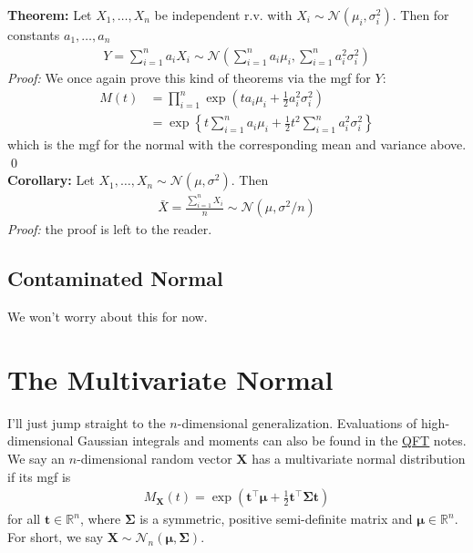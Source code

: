 \documentclass{book}
\theoremstyle{definition}
\newcommand{\R}{\mathbb{R}}
\newcommand{\nn}{\nonumber}
\newcommand{\X}{\mathbf{X}}
\newcommand{\f}[2]{\frac{#1}{#2}}
\newcommand{\lp}{\left(}
\newcommand{\rp}{\right)}
\newcommand{\lc}{\left\{}
\newcommand{\rc}{\right\}}
\begin{document}
\noindent\textbf{Theorem:}  Let $X_1, \dots, X_n$ be independent r.v. with $X_i \sim \mathcal{N}(\mu_i, \sigma_i^2)$. Then for constants $a_1,\dots, a_n$
\begin{align}
\boxed{Y = \sum^n_{i=1}a_i X_i \sim \mathcal{N}\lp \sum^n_{i=1}a_i\mu_i, \sum^n_{i=1}a_i^2\sigma^2_i \rp}
\end{align}
\noindent \textit{Proof:} We once again prove this kind of theorems via the mgf for $Y$:
\begin{align}
M(t) &= \prod^n_{i=1}\exp\lp ta_i\mu_i + \f{1}{2}a_i^2\sigma_i^2 \rp \nn\\
&= \exp\lc t\sum^n_{i=1}a_i\mu_i + \f{1}{2}t^2\sum^n_{i=1}a_i^2\sigma_i^2 \rc
\end{align}
which is the mgf for the normal with the corresponding mean and variance above. \qed\\


\textbf{Corollary:} Let $X_1, \dots, X_n \sim \mathcal{N}(\mu,\sigma^2)$. Then 
\begin{align}
\boxed{\bar{X} = \f{\sum^n_{i=1} X_i}{n} \sim \mathcal{N}\lp \mu, \sigma^2/n \rp}
\end{align} 
\noindent \textit{Proof:} the proof is left to the reader.



\subsection{Contaminated Normal}

We won't worry about this for now.


\section{The Multivariate Normal}
I'll just jump straight to the $n$-dimensional generalization. Evaluations of high-dimensional Gaussian integrals and moments can also be found in the \href{https://huanqbui.com/LaTeX projects/HuanBui_QM/HuanBui_QM.pdf}{\underline{QFT}} notes. \\

We say an $n$-dimensional random vector $\X$ has a multivariate normal distribution if its mgf is 
\begin{align}
\boxed{M_{\X}(t) = \exp\lp \mathbf{t}^\top\bm{\mu} + \f{1}{2}\mathbf{t}^\top\mathbf{\Sigma}\mathbf{t} \rp}
\end{align}
for all $\mathbf{t} \in \R^n$, where $\mathbf{\Sigma}$ is a symmetric, positive semi-definite matrix and $\bm{\mu} \in \R^n$. For short, we say $\X \sim \mathcal{N}_n(\bm{\mu}, \mathbf{\Sigma})$.   \\
\end{document}
